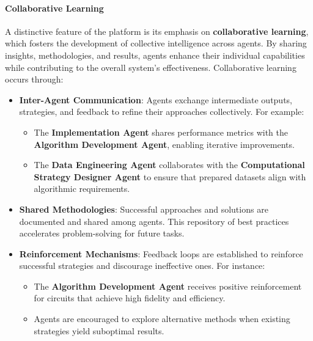 \documentclass[12pt]{article}
\begin{document}
\paragraph{Collaborative Learning}
A distinctive feature of the platform is its emphasis on \textbf{collaborative learning}, which fosters the development of collective intelligence across agents. By sharing insights, methodologies, and results, agents enhance their individual capabilities while contributing to the overall system’s effectiveness. Collaborative learning occurs through:
\begin{itemize}
    \item \textbf{Inter-Agent Communication}: Agents exchange intermediate outputs, strategies, and feedback to refine their approaches collectively. For example:
    \begin{itemize}
        \item The \textbf{Implementation Agent} shares performance metrics with the \textbf{Algorithm Development Agent}, enabling iterative improvements.
        \item The \textbf{Data Engineering Agent} collaborates with the \textbf{Computational Strategy Designer Agent} to ensure that prepared datasets align with algorithmic requirements.
    \end{itemize}
    \item \textbf{Shared Methodologies}: Successful approaches and solutions are documented and shared among agents. This repository of best practices accelerates problem-solving for future tasks.
    \item \textbf{Reinforcement Mechanisms}: Feedback loops are established to reinforce successful strategies and discourage ineffective ones. For instance:
    \begin{itemize}
        \item The \textbf{Algorithm Development Agent} receives positive reinforcement for circuits that achieve high fidelity and efficiency.
        \item Agents are encouraged to explore alternative methods when existing strategies yield suboptimal results.
    \end{itemize}
\end{itemize}
\end{document}
